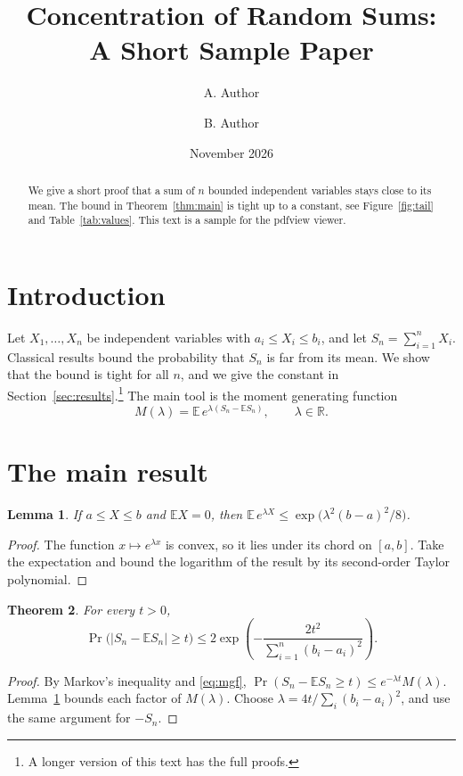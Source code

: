 \documentclass[11pt]{article}
\title{Concentration of Random Sums:\\ A Short Sample Paper}
\author{A. Author \and B. Author}
\date{November 2026}
\newtheorem{theorem}{Theorem}
\newtheorem{lemma}[theorem]{Lemma}
\begin{document}
\maketitle
\begin{abstract}
We give a short proof that a sum of $n$ bounded independent variables stays close to its mean.
The bound in Theorem~\ref{thm:main} is tight up to a constant, see Figure~\ref{fig:tail} and Table~\ref{tab:values}.
This text is a sample for the pdfview viewer.
\end{abstract}

\section{Introduction}\label{sec:intro}
Let $X_1,\dots,X_n$ be independent variables with $a_i \le X_i \le b_i$, and let $S_n=\sum_{i=1}^n X_i$.
Classical results \cite{hoeffding1963,boucheron2013} bound the probability that $S_n$ is far from its mean.
We show that the bound is tight for all $n$, and we give the constant in Section~\ref{sec:results}.\footnote{A longer
version of this text has the full proofs.}
The main tool is the moment generating function
\begin{equation}\label{eq:mgf}
  M(\lambda) = \mathbb{E}\, e^{\lambda (S_n - \mathbb{E} S_n)}, \qquad \lambda \in \mathbb{R}.
\end{equation}

\section{The main result}\label{sec:main}
\begin{lemma}\label{lem:hoeffding}
If $a \le X \le b$ and $\mathbb{E}X = 0$, then $\mathbb{E}\, e^{\lambda X} \le \exp\!\big(\lambda^2 (b-a)^2/8\big)$.
\end{lemma}
\begin{proof}
The function $x \mapsto e^{\lambda x}$ is convex, so it lies under its chord on $[a,b]$.
Take the expectation and bound the logarithm of the result by its second-order Taylor polynomial.
\end{proof}
\begin{theorem}\label{thm:main}
For every $t > 0$,
\begin{equation}\label{eq:bound}
  \Pr\big(|S_n - \mathbb{E}S_n| \ge t\big) \le 2 \exp\!\left(-\frac{2t^2}{\sum_{i=1}^n (b_i-a_i)^2}\right).
\end{equation}
\end{theorem}
\begin{proof}
By Markov's inequality and \eqref{eq:mgf}, $\Pr(S_n - \mathbb{E}S_n \ge t) \le e^{-\lambda t} M(\lambda)$.
Lemma~\ref{lem:hoeffding} bounds each factor of $M(\lambda)$. Choose
$\lambda = 4t / \sum_i (b_i - a_i)^2$, and use the same argument for $-S_n$.
\end{proof}
\end{document}
